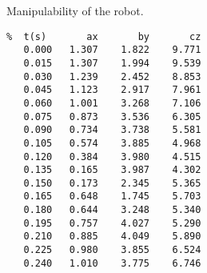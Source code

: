 Manipulability of the robot.
 \pagebreak[1]\begin{verbatim}
%  t(s)       ax       by       cz
   0.000   1.307    1.822    9.771
   0.015   1.307    1.994    9.539
   0.030   1.239    2.452    8.853
   0.045   1.123    2.917    7.961
   0.060   1.001    3.268    7.106
   0.075   0.873    3.536    6.305
   0.090   0.734    3.738    5.581
   0.105   0.574    3.885    4.968
   0.120   0.384    3.980    4.515
   0.135   0.165    3.987    4.302
   0.150   0.173    2.345    5.365
   0.165   0.648    1.745    5.703
   0.180   0.644    3.248    5.340
   0.195   0.757    4.027    5.290
   0.210   0.885    4.049    5.890
   0.225   0.980    3.855    6.524
   0.240   1.010    3.775    6.746
\end{verbatim}
